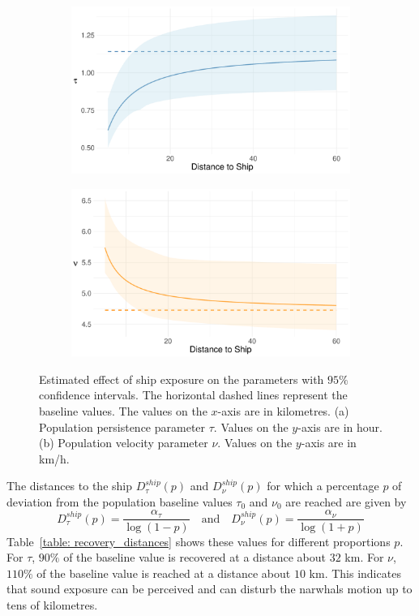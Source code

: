 \documentclass[aoas]{imsart}
\theoremstyle{definition}
\theoremstyle{remark}
\theoremstyle{remark}
\newcommand {\1}{\mathbb{1}}
\begin{document}
\begin{figure}[ht!]
	\begin{subfigure}{0.98\textwidth}\centering
		\includegraphics[width=0.7\linewidth]{"images/application/response/fe_tau_ExpShip_final.pdf"}
		\caption{}
	\end{subfigure}
	
	\begin{subfigure}{0.98\textwidth}
		\centering
		\includegraphics[width=0.7\linewidth]{"images/application/response/fe_nu_ExpShip_final.pdf"}
		\caption{}
	\end{subfigure}
	\caption{Estimated effect of ship exposure on the parameters with $95\%$ confidence intervals. The horizontal dashed lines represent the baseline values. The values on the $x$-axis are in kilometres. (a)  Population persistence parameter $\tau$. Values on the $y$-axis are in hour. (b) Population velocity parameter $\nu$. Values on the $y$-axis are in km/h.}
	\label{fig: population parameters response}
\end{figure}

The distances to the ship $D^{ship}_{\tau}(p)$ and $D^{ship}_{\nu}(p)$  for which a percentage $p$ of deviation from the population baseline values $\tau_0$ and $\nu_0$ are reached are given by 
\begin{equation}
	D^{ship}_{\tau}(p)=\frac{\alpha_{\tau}}{\log(1-p)} \quad  \mbox{and} \quad  D^{ship}_{\nu}(p)=\frac{\alpha_{\nu}}{\log(1+p)}
\end{equation}
Table~\ref{table: recovery_distances} shows these values for different proportions $p$.
For $\tau$, $90\%$ of the baseline value is recovered at a distance about $32$ km. For $\nu$, $110\%$ of the baseline value is reached at a distance about $10$ km. This indicates that sound exposure can be perceived and can disturb the narwhals motion up to tens of kilometres.
\end{document}
